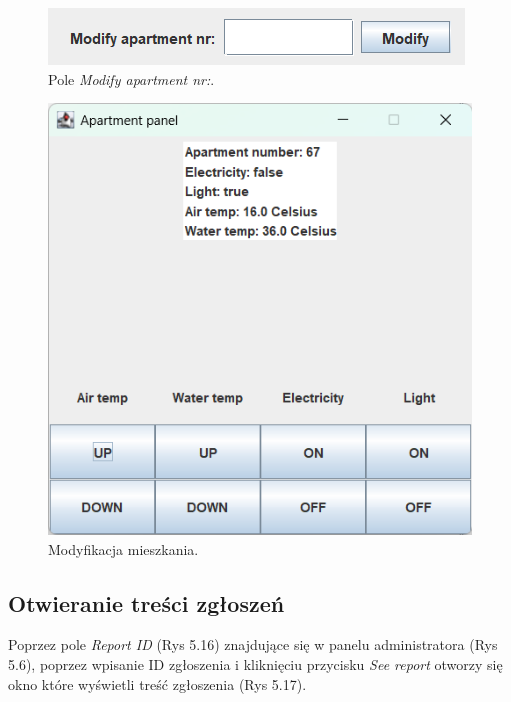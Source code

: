 \begin{figure}[H]
    \centering
    \includegraphics[width=\textwidth,height=0.15\textheight,keepaspectratio]{figures/app-images/admin-panel-modify.png}
    \caption{Pole \textit{Modify apartment nr:}.\label{fig19}}
\end{figure}

\begin{figure}[H]
    \centering
    \includegraphics[width=\textwidth,height=0.3\textheight,keepaspectratio]{figures/app-images/modify-apartment.png}
    \caption{Modyfikacja mieszkania.\label{fig20}}
\end{figure}

\newpage
\subsection{Otwieranie treści zgłoszeń}
Poprzez pole \textit{Report ID} (Rys 5.16) znajdujące się w panelu administratora (Rys 5.6), poprzez wpisanie ID zgłoszenia 
i kliknięciu przycisku \textit{See report} otworzy się okno które wyświetli treść zgłoszenia (Rys 5.17).

